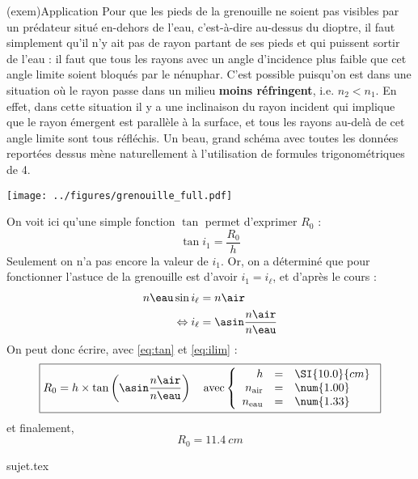 \documentclass[a4paper, 10pt]{book}
\begin{document}
{	\begin{tcb}[breakable](exem){Application}
		Pour que les pieds de la grenouille ne soient pas visibles par un prédateur
		situé en-dehors de l'eau, c'est-à-dire au-dessus du dioptre, il faut
		simplement qu'il n'y ait pas de rayon partant de ses pieds et qui puissent
		sortir de l'eau : il faut que tous les rayons avec un angle d'incidence plus
		faible que cet angle limite soient bloqués par le nénuphar. C'est possible
		puisqu'on est dans une situation où le rayon passe dans un milieu
		\textbf{moins réfringent}, i.e. $n_2 < n_1$. En effet, dans cette situation
		il y a une inclinaison du rayon incident qui implique que le rayon émergent
		est parallèle à la surface, et tous les rayons au-delà de cet angle limite
		sont tous réfléchis. Un beau, grand schéma avec toutes les données reportées
		dessus mène naturellement à l'utilisation de formules trigonométriques de
		4\ieme.
		\begin{center}
			\vspace*{-2.5cm}
			\texttt{[image: ../figures/grenouille\_full.pdf]}
		\end{center}
		On voit ici qu'une simple fonction $\tan$ permet d'exprimer $R_0$ :
		\[
			\boxed{\tan i_1 = \frac{R_0}{h}}
		\]
		Seulement on n'a pas encore la valeur de $i_1$. Or, on a déterminé que pour
		fonctionner l'astuce de la grenouille est d'avoir $i_1 = i_\ell$, et d'après
		le cours :
		\begin{align}
			n\eau\sin i_\ell       & = n\air                                    \\
			\Leftrightarrow i_\ell & = \asin \frac{n\air}{n\eau}\label{eq:ilim}
		\end{align}
		On peut donc écrire, avec \ref{eq:tan} et \ref{eq:ilim} :
		\[
			\boxed{
				R_0 = h\times\tan\left(\asin \frac{n\air}{n\eau}\right)
				\quad \text{avec}
				\left\{
				\begin{array}{rcl}
					h              & = & \SI{10.0}{cm} \\
					n_\mathrm{air} & = & \num{1.00}    \\
					n_\mathrm{eau} & = & \num{1.33}
				\end{array}
				\right.}
		\]
		et finalement,
		\[
			\boxed{R_0 = \SI{11.4}{cm}}
		\]
	\end{tcb}
}

\resetQ
{sujet.tex}

\resetQ
\newpage
\end{document}
